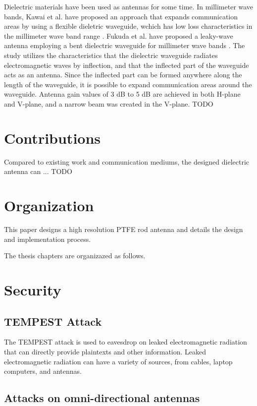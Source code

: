 \documentclass[a4paper,12pt]{report}
\begin{document}
Dielectric materials have been used as antennas for some time.
In millimeter wave bands, Kawai et al. have proposed an approach that expands
communication areas by using a flexible dieletric waveguide,
wchich has low loss characteristics in the millimeter wave band range \cite{new_area_formation_approach}.
Fukuda et al. have proposed a leaky-wave antenna employing a bent dielectric waveguide for
millimeter wave bands \cite{leaky_wave_antenna_bent_dielectric}.
The study utilizes the characteristics that the
dielectric waveguide radiates electromagnetic waves by
inflection, and that the inflected part of the waveguide acts as
an antenna.
Since the inflected part can be formed anywhere along the length of
the waveguide, it is possible to expand communication areas
around the waveguide. 
Antenna gain values of 3 dB to 5 dB are
achieved in both H-plane and V-plane,
and a narrow beam was created in the V-plane.
TODO

\section{Contributions}

Compared to existing work and communication mediums,
the designed dielectric antenna can ... TODO


\section{Organization}

This paper designs a high resolution PTFE rod antenna
and details the design and implementation process.

The thesis chapters are organizazed as follows.


\section{Security}

\subsection{TEMPEST Attack}

The TEMPEST attack is used to eavesdrop on
leaked electromagnetic radiation that can directly
provide plaintexts and other information.
Leaked electromagnetic radiation can have a variety of sources,
from cables, laptop computers, and antennas.

\subsection{Attacks on omni-directional antennas}
\end{document}
